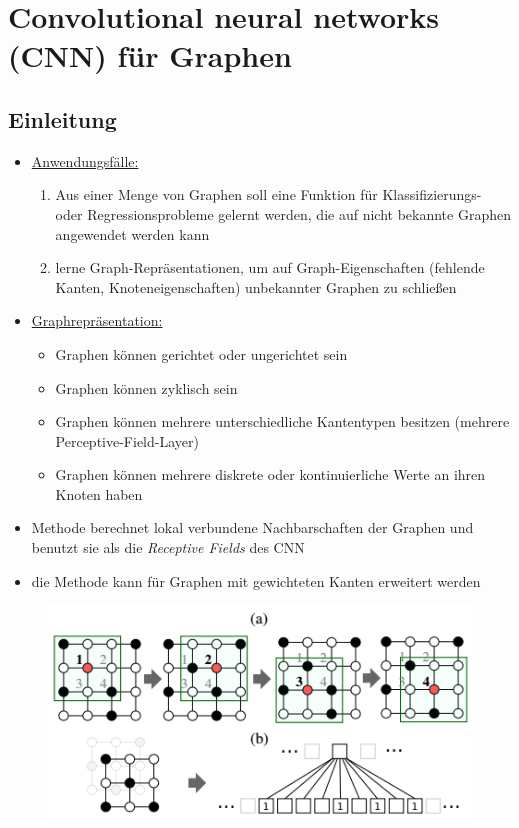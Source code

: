 \section{Convolutional neural networks (CNN) für Graphen}

\subsection{Einleitung}

\begin{itemize}
  \item \underline{Anwendungsfälle:}
  \begin{enumerate}
    \item Aus einer Menge von Graphen soll eine Funktion für Klassifizierungs- oder Regressionsprobleme gelernt werden, die auf nicht bekannte Graphen angewendet werden kann
    \item lerne Graph-Repräsentationen, um auf Graph-Eigenschaften (fehlende Kanten, Knoteneigenschaften) unbekannter Graphen zu schließen
  \end{enumerate}
\item \underline{Graphrepräsentation:}
  \begin{itemize}
    \item Graphen können gerichtet oder ungerichtet sein
    \item Graphen können zyklisch sein
    \item Graphen können mehrere unterschiedliche Kantentypen besitzen (mehrere Perceptive-Field-Layer)
    \item Graphen können mehrere diskrete oder kontinuierliche Werte an ihren Knoten haben
  \end{itemize}
\item Methode berechnet lokal verbundene Nachbarschaften der Graphen und benutzt sie als die \emph{Receptive Fields} des CNN
\item die Methode kann für Graphen mit gewichteten Kanten erweitert werden
\end{itemize}

\begin{figure}[h]
  \centering
  \includegraphics[width=.5\textwidth]{images/cnn_graph.png}
\end{figure}

